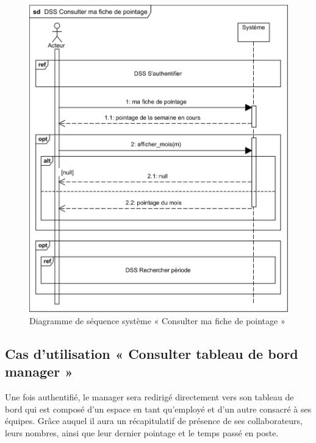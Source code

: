 \begin{figure}[h!]
     \centering
     \includegraphics[scale=1.1]{images/DSS/DSS Consulter ma fiche de pointage.png}
     \caption{Diagramme de séquence système « Consulter ma  fiche de pointage »}
     \label{fig4}
\end{figure}

\vspace{-30pt}
\subsection{Cas d'utilisation « Consulter tableau de bord manager »}
Une fois authentifié, le manager sera redirigé directement vers son tableau de
bord qui est composé d’un espace en tant qu’employé et d'un autre consacré à ses
équipes. Grâce auquel il aura un récapitulatif de présence de ses
collaborateurs, leurs nombres, ainsi que leur dernier pointage et le temps passé
en poste.

